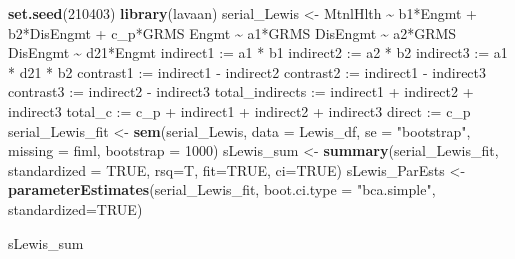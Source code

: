 \documentclass[
  11pt,
]{book}
\newenvironment{Shaded}{\begin{snugshade}}{\end{snugshade}}
\newcommand{\AttributeTok}[1]{\textcolor[rgb]{0.27,0.27,0.27}{#1}}
\newcommand{\ConstantTok}[1]{\textcolor[rgb]{0.37,0.37,0.37}{#1}}
\newcommand{\DecValTok}[1]{\textcolor[rgb]{0.06,0.06,0.06}{#1}}
\newcommand{\FunctionTok}[1]{\textcolor[rgb]{0.27,0.27,0.27}{\textbf{#1}}}
\newcommand{\NormalTok}[1]{#1}
\newcommand{\OtherTok}[1]{\textcolor[rgb]{0.37,0.37,0.37}{#1}}
\newcommand{\StringTok}[1]{\textcolor[rgb]{0.5,0.5,0.5}{#1}}
\begin{document}
\begin{Shaded}
\begin{Highlighting}[]
\FunctionTok{set.seed}\NormalTok{(}\DecValTok{210403}\NormalTok{)}
\FunctionTok{library}\NormalTok{(lavaan)}
\NormalTok{serial\_Lewis }\OtherTok{\textless{}{-}} \StringTok{\textquotesingle{}}
\StringTok{    MtnlHlth \textasciitilde{} b1*Engmt + b2*DisEngmt + c\_p*GRMS}
\StringTok{    Engmt \textasciitilde{} a1*GRMS    }
\StringTok{    DisEngmt \textasciitilde{} a2*GRMS}
\StringTok{    DisEngmt \textasciitilde{} d21*Engmt}
\StringTok{    indirect1 := a1 * b1}
\StringTok{    indirect2 := a2 * b2}
\StringTok{    indirect3 := a1 * d21 * b2}
\StringTok{    contrast1 := indirect1 {-} indirect2}
\StringTok{    contrast2 := indirect1 {-} indirect3}
\StringTok{    contrast3 := indirect2 {-} indirect3}
\StringTok{    total\_indirects := indirect1 + indirect2 + indirect3}
\StringTok{    total\_c := c\_p + indirect1 + indirect2 + indirect3}
\StringTok{    direct := c\_p}
\StringTok{\textquotesingle{}}
\NormalTok{serial\_Lewis\_fit }\OtherTok{\textless{}{-}} \FunctionTok{sem}\NormalTok{(serial\_Lewis, }\AttributeTok{data =}\NormalTok{ Lewis\_df, }\AttributeTok{se =} \StringTok{"bootstrap"}\NormalTok{, }\AttributeTok{missing =} \StringTok{\textquotesingle{}fiml\textquotesingle{}}\NormalTok{, }\AttributeTok{bootstrap =} \DecValTok{1000}\NormalTok{)}
\NormalTok{sLewis\_sum }\OtherTok{\textless{}{-}} \FunctionTok{summary}\NormalTok{(serial\_Lewis\_fit, }\AttributeTok{standardized =} \ConstantTok{TRUE}\NormalTok{, }\AttributeTok{rsq=}\NormalTok{T, }\AttributeTok{fit=}\ConstantTok{TRUE}\NormalTok{, }\AttributeTok{ci=}\ConstantTok{TRUE}\NormalTok{)    }
\NormalTok{sLewis\_ParEsts }\OtherTok{\textless{}{-}} \FunctionTok{parameterEstimates}\NormalTok{(serial\_Lewis\_fit, }\AttributeTok{boot.ci.type =} \StringTok{"bca.simple"}\NormalTok{, }\AttributeTok{standardized=}\ConstantTok{TRUE}\NormalTok{)}
\end{Highlighting}
\end{Shaded}

\begin{Shaded}
\begin{Highlighting}[]
\NormalTok{sLewis\_sum}
\end{Highlighting}
\end{Shaded}
\end{document}
